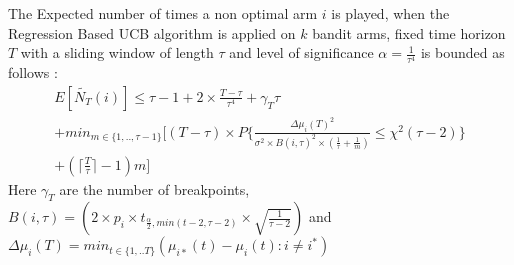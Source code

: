 \documentclass[compress, serif, onlymath, professionalfonts]{beamer}
\begin{document}
\begin{frame}
\begin{footnotesize}

\begin{theorem}
\label{thm:rucb}
The Expected number of times a non optimal arm $i$ is played, when the Regression Based UCB algorithm is applied on $k$ bandit arms, fixed time horizon $T$ with a sliding window of length $\tau$ and level of significance $\alpha=\frac{1}{\tau^4}$   is bounded as follows :
\begin{multline*}E[\tilde{N_T}(i)] \leq \tau-1+2\times\frac{T-\tau}{\tau^4}+\gamma_T\tau\\+ min_{m \in \{1,..,\tau-1\} }[(T-\tau)\times P\{\frac{\Delta \mu_i(T)^2}{\sigma^2 \times B(i,\tau)^2 \times (\frac{1}{\tau}+\frac{1}{m})} \leq \chi^2(\tau-2)\}\\+( \lceil{\frac{T}{\tau}}\rceil-1)m]
\end{multline*}
Here $\gamma_T$ are the number of breakpoints, $B(i,\tau)=(2 \times p_i\times t_{\frac{\alpha}{2},min(t-2,\tau-2)}\times \sqrt{\frac{1}{\tau-2}} )$ and $\Delta \mu_i(T)=min_{t \in \{1,..T\}}(\mu_{i*}(t)-\mu_i(t):i \neq i^*)$
\end{theorem}

\end{footnotesize}
\end{frame}
\end{document}
